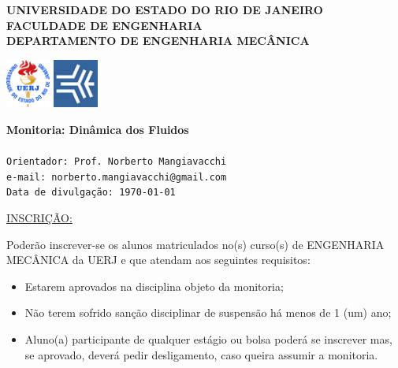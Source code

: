 \documentclass[a4paper,portuguese,12pt]{article}
\begin{document}
\thispagestyle{empty}

\begin{minipage}{0.72\linewidth}
	\normalsize\textbf{UNIVERSIDADE DO ESTADO DO RIO DE JANEIRO\\
	              FACULDADE DE ENGENHARIA\\
				  DEPARTAMENTO DE ENGENHARIA MECÂNICA}
\end{minipage}
\begin{minipage}{0.27\linewidth}
	\flushright
	\includegraphics[height=16mm]{figs/logouerj.jpg}
	\hspace{.5cm}
	\includegraphics[height=16mm]{figs/fen.png}
\end{minipage}

\hrulefill

\Large \color{NavyBlue} \textbf{Monitoria: Dinâmica dos Fluidos}\\
\color{Black}\\ 
\normalsize \texttt{Orientador: Prof. Norberto Mangiavacchi}\\
\normalsize \texttt{e-mail: norberto.mangiavacchi@gmail.com}\\
\normalsize \texttt{Data de divulgação: \today}

\vspace{1cm}

\underline{INSCRIÇÃO:}

Poderão inscrever-se os alunos matriculados no(s) curso(s) de ENGENHARIA
MECÂNICA da UERJ e que atendam aos seguintes requisitos:

\begin{itemize}
	\item Estarem aprovados na disciplina objeto da monitoria;
	\item Não terem sofrido sanção disciplinar de suspensão há menos de
	1 (um) ano;
	\item Aluno(a) participante de qualquer estágio ou bolsa poderá se
	inscrever mas, se aprovado, deverá pedir desligamento, caso queira
	assumir a monitoria.
\end{itemize}
\end{document}
